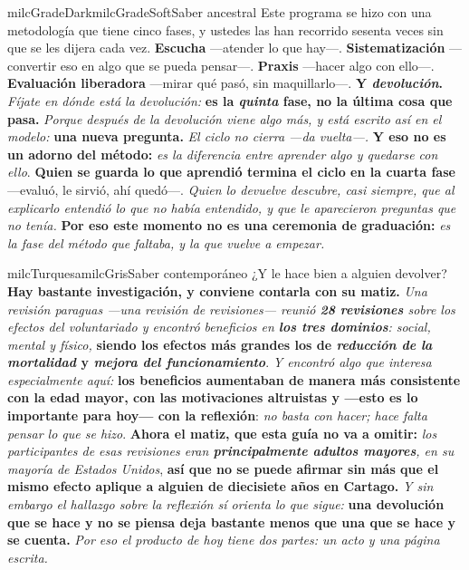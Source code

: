 \documentclass[11pt,letterpaper]{article}
\begin{document}
\begin{softbox}{milcGradeDark}{milcGradeSoft}{Saber ancestral}
Este programa se hizo con una metodología que tiene cinco fases, y ustedes las han recorrido sesenta veces sin que se les dijera cada vez. \textbf{Escucha} ---atender lo que hay---. \textbf{Sistematización} ---convertir eso en algo que se pueda pensar---. \textbf{Praxis} ---hacer algo con ello---. \textbf{Evaluación liberadora} ---mirar qué pasó, sin maquillarlo---. \textbf{Y \emph{devolución}.} \emph{Fíjate en dónde está la devolución:} \textbf{es la \emph{quinta} fase, no la última cosa que pasa.} \emph{Porque después de la devolución viene algo más, y está escrito así en el modelo:} \textbf{una \textbf{nueva pregunta}.} \emph{El ciclo no cierra ---da vuelta---.} \textbf{Y eso no es un adorno del método:} \emph{es la diferencia entre aprender algo y quedarse con ello}. \textbf{Quien se guarda lo que aprendió termina el ciclo en la cuarta fase} ---evaluó, le sirvió, ahí quedó---. \emph{Quien lo devuelve descubre, casi siempre, que al explicarlo entendió lo que no había entendido, y que le aparecieron preguntas que no tenía.} \textbf{Por eso este momento no es una ceremonia de graduación:} \emph{es la fase del método que faltaba, y la que vuelve a empezar.}
\end{softbox}

\begin{softbox}{milcTurquesa}{milcGris}{Saber contemporáneo}
¿Y le hace bien a alguien devolver? \textbf{Hay bastante investigación, y conviene contarla con su matiz.} \emph{Una revisión paraguas ---una revisión de revisiones--- reunió \textbf{28 revisiones} sobre los efectos del voluntariado y encontró beneficios en \textbf{los tres dominios}: social, mental y físico,} \textbf{siendo los efectos más grandes los de \emph{reducción de la mortalidad} y \emph{mejora del funcionamiento}}. \emph{Y encontró algo que interesa especialmente aquí:} \textbf{los beneficios aumentaban de manera más consistente con la edad mayor, con las motivaciones altruistas y ---esto es lo importante para hoy--- con \textbf{la reflexión}}: \emph{no basta con hacer; hace falta pensar lo que se hizo}. \textbf{Ahora el matiz, que esta guía no va a omitir:} \emph{los participantes de esas revisiones eran \textbf{principalmente adultos mayores}, en su mayoría de Estados Unidos}, \textbf{así que no se puede afirmar sin más que el mismo efecto aplique a alguien de diecisiete años en Cartago.} \emph{Y sin embargo el hallazgo sobre la reflexión sí orienta lo que sigue:} \textbf{una devolución que se hace y no se piensa deja bastante menos que una que se hace y se cuenta.} \emph{Por eso el producto de hoy tiene dos partes: un acto y una página escrita.}
\end{softbox}
\end{document}
